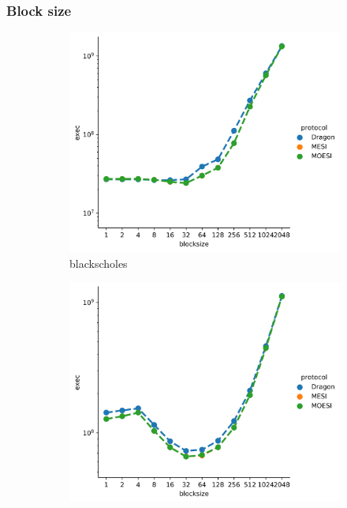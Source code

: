 \documentclass[nonacm,acmsmall,screen,11pt]{acmart}
\begin{document}
\subsubsection{Block size}
\begin{figure}[htb!]
  \centering
  \begin{subfigure}{0.32\textwidth}
    \includegraphics[width=\textwidth]{blocksize-blackscholes}
    \caption{blackscholes}
  \end{subfigure}
  \begin{subfigure}{0.32\textwidth}
    \includegraphics[width=\columnwidth]{blocksize-bodytrack}

\end{subfigure}
\end{figure}
\end{document}
